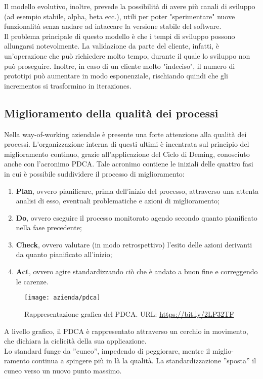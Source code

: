 Il modello evolutivo, inoltre, prevede la possibilità di avere più canali di sviluppo (ad esempio stabile, alpha, beta ecc.), utili per poter "sperimentare" nuove funzionalità senza andare ad intaccare la versione stabile del software.\\
Il problema principale di questo modello è che i tempi di sviluppo possono allungarsi notevolmente. La validazione da parte del cliente, infatti, è un'operazione che può richiedere molto tempo, durante il quale lo sviluppo non può proseguire. Inoltre, in caso di un cliente molto "indeciso", il numero di prototipi può aumentare in modo esponenziale, rischiando quindi che gli \glspl{incremento} si trasformino in \glspl{iterazione}.

\subsection{Miglioramento della qualità dei processi}
Nella way-of-working aziendale è presente una forte attenzione alla qualità dei processi. L'organizzazione interna di questi ultimi è incentrata sul principio del miglioramento continuo, grazie all'applicazione del Ciclo di Deming, conosciuto anche con l'acronimo PDCA. Tale acronimo contiene le iniziali delle quattro fasi in cui è possibile suddividere il processo di miglioramento: \begin{enumerate}
	\item \textbf{Plan}, ovvero pianificare, prima dell'inizio del processo, attraverso una attenta analisi di esso, eventuali problematiche e azioni di miglioramento;
	\item \textbf{Do}, ovvero eseguire il processo monitorato agendo secondo quanto pianificato nella fase precedente;
	\item \textbf{Check}, ovvero valutare (in modo retrospettivo) l'esito delle azioni derivanti da quanto pianificato all'inizio;
	\item \textbf{Act}, ovvero agire standardizzando ciò che è andato a buon fine e correggendo le carenze.
\end{enumerate}
\begin{figure}[!h] 
	\centering 
	\texttt{[image: azienda/pdca]} 
	\caption{Rappresentazione grafica del PDCA. URL: \url{https://bit.ly/2LP32TF} }
\end{figure}
A livello grafico, il PDCA è rappresentato attraverso un cerchio in movimento, che dichiara la ciclicità della sua applicazione.\\

Lo standard funge da ”cuneo”, impedendo di peggiorare, mentre il miglio-
ramento continua a spingere più in là la qualità. La standardizzazione
”sposta” il cuneo verso un nuovo punto massimo.
